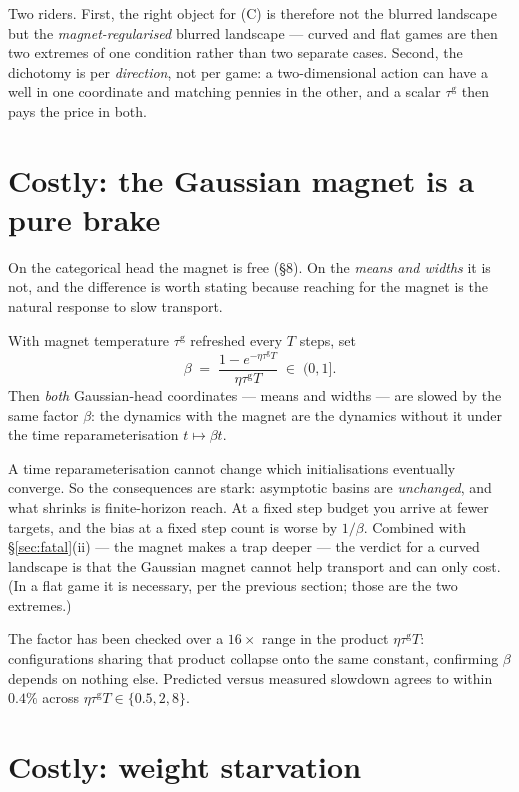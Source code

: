 \documentclass[11pt]{article}
\theoremstyle{definition}
\begin{document}
Two riders. First, the right object for (C) is therefore not the blurred landscape
but the \emph{magnet-regularised} blurred landscape --- curved and flat games are
then two extremes of one condition rather than two separate cases. Second, the
dichotomy is per \emph{direction}, not per game: a two-dimensional action can
have a well in one coordinate and matching pennies in the other, and a scalar
$\tau^{\mathrm g}$ then pays the price in both.

\section{Costly: the Gaussian magnet is a pure brake}\label{sec:brake}

On the categorical head the magnet is free (\S8). On the \emph{means and widths}
it is not, and the difference is worth stating because reaching for the magnet is
the natural response to slow transport.

With magnet temperature $\tau^{\mathrm g}$ refreshed every $T$ steps, set
\[
  \beta \;=\; \frac{1 - e^{-\eta\tau^{\mathrm g}T}}{\eta\tau^{\mathrm g}T}
  \;\in\; (0,1] .
\]
Then \emph{both} Gaussian-head coordinates --- means and widths --- are slowed by
the same factor $\beta$: the dynamics with the magnet are the dynamics without it
under the time reparameterisation $t \mapsto \beta t$.

A time reparameterisation cannot change which initialisations eventually
converge. So the consequences are stark: asymptotic basins are \emph{unchanged},
and what shrinks is finite-horizon reach. At a fixed step budget you arrive at
fewer targets, and the bias at a fixed step count is worse by $1/\beta$. Combined
with \S\ref{sec:fatal}(ii) --- the magnet makes a trap deeper --- the verdict for a
curved landscape is that the Gaussian magnet cannot help transport and can only
cost. (In a flat game it is necessary, per the previous section; those are the two
extremes.)

The factor has been checked over a $16\times$ range in the product
$\eta\tau^{\mathrm g}T$: configurations sharing that product collapse onto the
same constant, confirming $\beta$ depends on nothing else. Predicted versus
measured slowdown agrees to within $0.4\%$ across
$\eta\tau^{\mathrm g}T \in \{0.5, 2, 8\}$.

\section{Costly: weight starvation}
\end{document}
